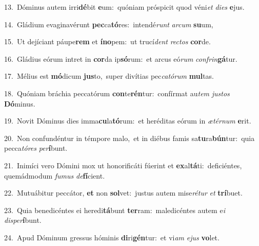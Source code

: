 {\numbfont\textcolor{\numbcolor}{13.}}~Dóminus autem irri\-\textbf{dé}\-bit \textbf{e}\-um:~\star quóniam próspicit quod véni\textit{et} \textit{di}\-\textit{es} \textbf{e}\-jus.\par
{\numbfont\textcolor{\numbcolor}{14.}}~Gládium evaginavérunt \textbf{pec}\-ca\-\textbf{tó}\-res:~\star intendé\textit{runt} \textit{ar}\-\textit{cum} \textbf{su}\-um,\par
{\numbfont\textcolor{\numbcolor}{15.}}~Ut dejíciant páupe\textbf{rem} et \textbf{ín}\-\textbf{o}pem:~\star ut trucí\textit{dent} \textit{rec}\-\textit{tos} \textbf{cor}\-de.\par
{\numbfont\textcolor{\numbcolor}{16.}}~Gládius eórum intret in \textbf{cor}\-da ip\-\textbf{só}\-rum:~\star et arcus eó\textit{rum} \textit{con}\-\textit{frin}\textbf{gá}tur.\par
{\numbfont\textcolor{\numbcolor}{17.}}~Mélius est \textbf{mó}\-dicum \textbf{jus}\-to,~\star super divítias pec\-\textit{ca}\-\textit{tó}\textit{rum} \textbf{mul}\-tas.\par
{\numbfont\textcolor{\numbcolor}{18.}}~Quóniam bráchia peccatórum \textbf{con}\-te\-\textbf{rén}\-tur:~\star confírmat au\textit{tem} \textit{jus}\-\textit{tos} \textbf{Dó}\-minus.\par
{\numbfont\textcolor{\numbcolor}{19.}}~Novit Dóminus dies imma\-\textbf{cu}\-la\-\textbf{tó}\-rum:~\star et heréditas eórum in \textit{æ}\-\textit{tér}\textit{num} \textbf{e}\-rit.\par
{\numbfont\textcolor{\numbcolor}{20.}}~Non confundéntur in témpore malo,~\dagger et in diébus famis sa\-\textbf{tu}\-ra\-\textbf{bún}\-tur:~\star quia pecca\-\textit{tó}\-\textit{res} \textit{per}\-\textbf{í}bunt.\par
{\numbfont\textcolor{\numbcolor}{21.}}~Inimíci vero Dómini mox ut honorificáti fúerint et \textbf{ex}\-al\-\textbf{tá}\-ti:~\star deficiéntes, quemádmodum \textit{fu}\-\textit{mus} \textit{de}\-\textbf{fí}cient.\par
{\numbfont\textcolor{\numbcolor}{22.}}~Mutuábitur peccátor, \textbf{et} non \textbf{sol}\-vet:~\star justus autem mise\-\textit{ré}\-\textit{tur} \textit{et} \textbf{trí}\-buet.\par
{\numbfont\textcolor{\numbcolor}{23.}}~Quia benedicéntes ei heredi\-\textbf{tá}\-bunt \textbf{ter}\-ram:~\star maledicéntes autem e\textit{i} \textit{dis}\-\textit{per}\textbf{í}bunt.\par
{\numbfont\textcolor{\numbcolor}{24.}}~Apud Dóminum gressus hóminis \textbf{di}\-ri\-\textbf{gén}\-tur:~\star et vi\textit{am} \textit{e}\-\textit{jus} \textbf{vo}\-let.\par
